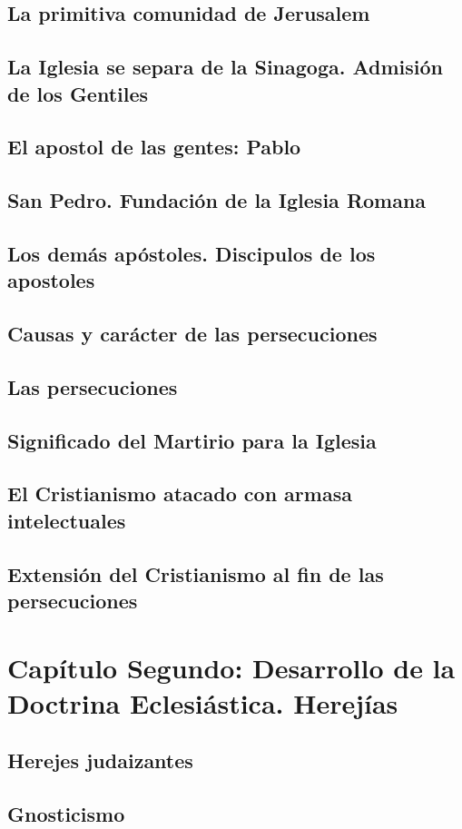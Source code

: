 \raggedbottom{} \documentclass[12pt]{book}
\begin{document}
\section{La primitiva comunidad de Jerusalem}
\section{La Iglesia se separa de la Sinagoga. Admisión de los Gentiles}
\section{El apostol de las gentes: Pablo}
\section{San Pedro. Fundación de la Iglesia Romana}
\section{Los demás apóstoles. Discipulos de los apostoles}
\section{Causas y carácter de las persecuciones}
\section{Las persecuciones}
\section{Significado del Martirio para la Iglesia}
\section{El Cristianismo atacado con armasa intelectuales}
\section{Extensión del Cristianismo al fin de las persecuciones}
\chapter{Capítulo Segundo: Desarrollo de la Doctrina Eclesiástica. Herejías}
\section{Herejes judaizantes}
\section{Gnosticismo}
\end{document}
